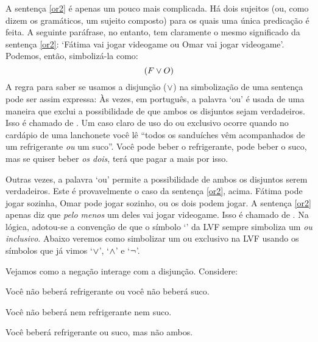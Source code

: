 A sentença \ref{or2} é apenas um pouco mais complicada.
Há dois sujeitos (ou, como dizem os gramáticos, um sujeito composto) para os quais uma única predicação é feita.
A seguinte paráfrase, no entanto, tem claramente o mesmo significado da sentença  \ref{or2}:
`Fátima vai jogar videogame ou Omar vai jogar videogame'.
Podemos, então, simbolizá-la como:
$$(F \vee O)$$
A regra para saber se usamos a disjunção ($\vee$) na simbolização de uma sentença pode ser assim expressa:
Às vezes, em português, a palavra `ou' é usada de uma maneira que exclui a possibilidade de que ambos os disjuntos sejam verdadeiros.
Isso é chamado de .
Um caso claro de uso do ou exclusivo ocorre quando no cardápio de uma lanchonete você lê ``todos os sanduíches vêm acompanhados de um refrigerante \emph{ou} um suco''.
Você pode beber o refrigerante, pode beber o suco, mas se quiser beber \emph{os dois}, terá que pagar a mais por isso.

Outras vezes, a palavra `ou' permite a possibilidade de ambos os disjuntos serem verdadeiros.
Este é provavelmente o caso da sentença \ref{or2}, acima.
Fátima pode jogar sozinha, Omar pode jogar sozinho, ou os dois podem jogar.
A sentença \ref{or2} apenas diz que \emph{pelo menos} um deles vai jogar videogame. Isso é chamado de .
Na lógica, adotou-se a convenção de que o símbolo `\eor' da LVF sempre simboliza um \emph{ou inclusivo}.
Abaixo veremos como simbolizar um ou exclusivo na LVF usando os símbolos que já vimos `$\vee$', `$\wedge$' e `$\neg$'.

Vejamos como a negação interage com a disjunção. Considere:
	\begin{earg}
		\item[\ex{or3}] Você não beberá refrigerante ou você não beberá suco.
		\item[\ex{or4}] Você não beberá nem refrigerante nem suco.
		\item[\ex{or.xor}] Você beberá refrigerante ou suco, mas não ambos.
	\end{earg}

